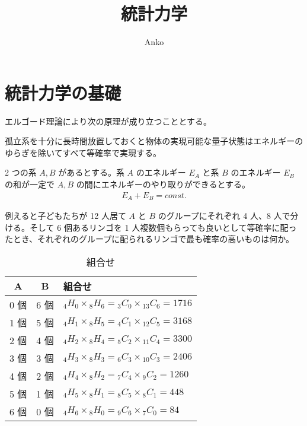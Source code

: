 \documentclass[uplatex,dvipdfmx,a4paper,11pt]{jlreq}
\title{統計力学}
\author{Anko}
\theoremstyle{definition}
\begin{document}
\maketitle
\tableofcontents
\clearpage

\section{統計力学の基礎}
エルゴード理論により次の原理が成り立つこととする。
\begin{axiom}[等確率の原理]
  孤立系を十分に長時間放置しておくと物体の実現可能な量子状態はエネルギーのゆらぎを除いてすべて等確率で実現する。
\end{axiom}

2 つの系 $A, B$ があるとする。系 $A$ のエネルギー $E_A$ と系 $B$ のエネルギー $E_B$ の和が一定で $A, B$ の間にエネルギーのやり取りができるとする。
\begin{align}
  E_A + E_B = const.
\end{align}

例えると子どもたちが 12 人居て $A$ と $B$ のグループにそれぞれ 4 人、8 人で分ける。そして 6 個あるリンゴを 1 人複数個もらっても良いとして等確率に配ったとき、それぞれのグループに配られるリンゴで最も確率の高いものは何か。
\begin{table}[hbtp]
  \label{table:micro}
  \centering
  \begin{tabular}{|c|c|l|}
    \hline
    A   & B   & 組合せ                                                         \\
    \hline
    0 個 & 6 個 & ${}_4H_0\times {}_{8}H_6 = {}_3C_0\times {}_{13}C_6 = 1716$ \\
    1 個 & 5 個 & ${}_4H_1\times {}_{8}H_5 = {}_4C_1\times {}_{12}C_5 = 3168$ \\
    2 個 & 4 個 & ${}_4H_2\times {}_{8}H_4 = {}_5C_2\times {}_{11}C_4 = 3300$ \\
    3 個 & 3 個 & ${}_4H_3\times {}_{8}H_3 = {}_6C_3\times {}_{10}C_3 = 2406$ \\
    4 個 & 2 個 & ${}_4H_4\times {}_{8}H_2 = {}_7C_4\times {}_{9}C_2 = 1260$  \\
    5 個 & 1 個 & ${}_4H_5\times {}_{8}H_1 = {}_8C_5\times {}_{8}C_1 = 448$   \\
    6 個 & 0 個 & ${}_4H_6\times {}_{8}H_0 = {}_9C_6\times {}_{7}C_0 = 84$    \\
    \hline
  \end{tabular}
  \caption{組合せ}
\end{table}
\end{document}
